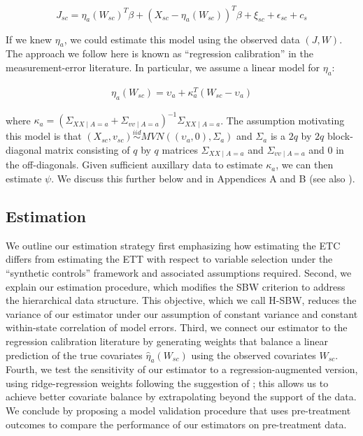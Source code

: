 \documentclass[article]{imsart}
\theoremstyle{plain}
\theoremstyle{remark}
\begin{document}
\begin{equation}
    J_{sc} = \eta_a(W_{sc})^T\beta + (X_{sc} - \eta_a(W_{sc}))^T\beta + \xi_{sc} + \epsilon_{sc} + c_s 
\end{equation}

If we knew $\eta_a$, we could estimate this model using the observed data $(J, W)$. The approach we follow here is known as ``regression calibration'' in the measurement-error literature. In particular, we assume a linear model for $\eta_a$:

\begin{align*}
\eta_a(W_{sc}) = \upsilon_a + \kappa_a^T(W_{sc} - \upsilon_a)
\end{align*}

where $\kappa_a = (\Sigma_{XX \mid A = a} + \Sigma_{vv \mid A = a})^{-1}\Sigma_{XX \mid A = a}$. The assumption motivating this model is that $(X_{sc}, v_{sc}) \stackrel{iid}\sim MVN((\upsilon_a, 0), \Sigma_a)$ and $\Sigma_a$ is a $2q$ by $2q$ block-diagonal matrix consisting of $q$ by $q$ matrices $\Sigma_{XX \mid A = a}$ and $\Sigma_{vv \mid A = a}$ and $0$ in the off-diagonals. Given sufficient auxillary data to estimate $\kappa_a$, we can then estimate $\psi$. We discuss this further below and in Appendices A and B (see also \cite{gleser1992importance}).

\subsection{Estimation}

We outline our estimation strategy first emphasizing how estimating the ETC differs from estimating the ETT with respect to variable selection under the ``synthetic controls'' framework and associated assumptions required. Second, we explain our estimation procedure, which modifies the SBW criterion to address the hierarchical data structure. This objective, which we call H-SBW, reduces the variance of our estimator under our assumption of constant variance and constant within-state correlation of model errors. Third, we connect our estimator to the regression calibration literature by generating weights that balance a linear prediction of the true covariates $\hat{\eta}_a(W_{sc})$ using the observed covariates $W_{sc}$. Fourth, we test the sensitivity of our estimator to a regression-augmented version, using ridge-regression weights following the suggestion of \cite{ben2018augmented}; this allows us to achieve better covariate balance by extrapolating beyond the support of the data. We conclude by proposing a model validation procedure that uses pre-treatment outcomes to compare the performance of our estimators on pre-treatment data.
\end{document}
